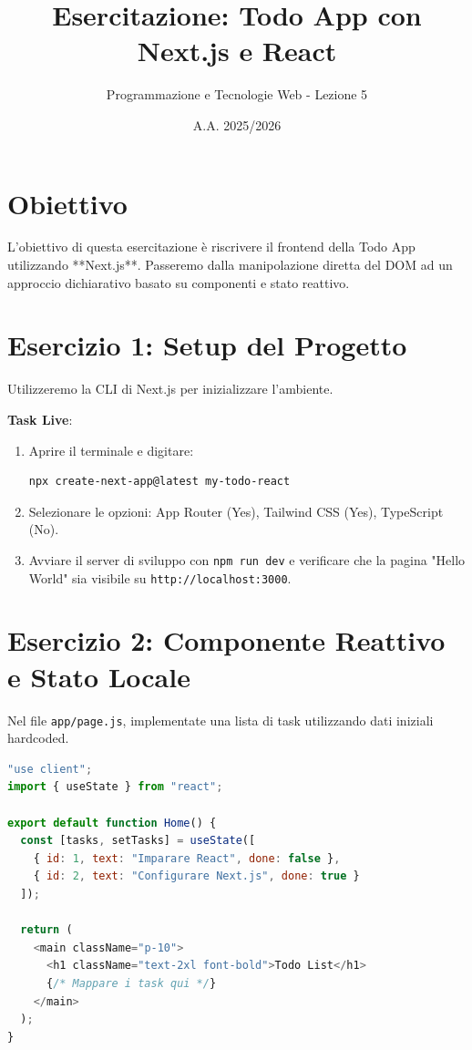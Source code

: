 \documentclass[11pt,a4paper]{article}
\title{\textbf{\color{primary} Esercitazione: Todo App con Next.js e React}}
\author{Programmazione e Tecnologie Web - Lezione 5}
\date{A.A. 2025/2026}
\begin{document}
\maketitle

\section{Obiettivo}
L'obiettivo di questa esercitazione è riscrivere il frontend della Todo App utilizzando **Next.js**. Passeremo dalla manipolazione diretta del DOM ad un approccio dichiarativo basato su componenti e stato reattivo.

\section{Esercizio 1: Setup del Progetto}
Utilizzeremo la CLI di Next.js per inizializzare l'ambiente.

\textbf{Task Live}:
\begin{enumerate}
    \item Aprire il terminale e digitare:
    \begin{lstlisting}[language=bash]
npx create-next-app@latest my-todo-react
    \end{lstlisting}
    \item Selezionare le opzioni: App Router (Yes), Tailwind CSS (Yes), TypeScript (No).
    \item Avviare il server di sviluppo con \texttt{npm run dev} e verificare che la pagina "Hello World" sia visibile su \texttt{http://localhost:3000}.
\end{enumerate}

\section{Esercizio 2: Componente Reattivo e Stato Locale}
Nel file \texttt{app/page.js}, implementate una lista di task utilizzando dati iniziali hardcoded.

\begin{lstlisting}[language=javascript]
"use client";
import { useState } from "react";

export default function Home() {
  const [tasks, setTasks] = useState([
    { id: 1, text: "Imparare React", done: false },
    { id: 2, text: "Configurare Next.js", done: true }
  ]);

  return (
    <main className="p-10">
      <h1 className="text-2xl font-bold">Todo List</h1>
      {/* Mappare i task qui */}
    </main>
  );
}
\end{lstlisting}
\end{document}
